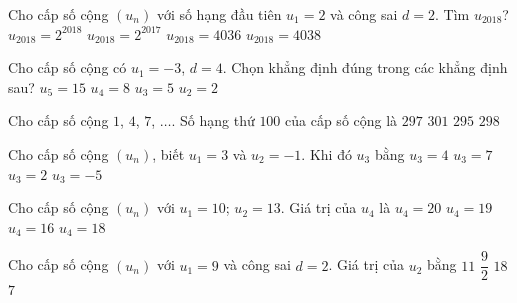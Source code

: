 \begin{ex}%
	Cho cấp số cộng $(u_n)$ với số hạng đầu tiên $u_1=2$ và công  sai $d=2$. Tìm $u_{2018}$?
	 \choice
		 {$u_{2018}=2^{2018}$}
		{$u_{2018}=2^{2017}$} 
		{\True $u_{2018}=4036$} 
		 {$u_{2018}=4038$}
\end{ex}

\begin{ex}%
	Cho cấp số cộng  có $u_1=-3$, $d=4$. Chọn khẳng định đúng trong các khẳng định sau?
	 \choice
		 {$u_5=15$}
		{$u_4=8$} 
		{\True $u_3=5$} 
		 {$u_2=2$}
\end{ex}

\begin{ex}%
	Cho cấp số cộng $1$, $4$, $7$, $\ldots$. Số  hạng thứ $100$ của cấp số cộng là
	\choice 
		 {$297$}
		{$301$} 
		{$295$} 
		 {\True $298$}
\end{ex}

\begin{ex}%
	Cho cấp số cộng $(u_n)$, biết $u_1=3$ và $u_2=-1$. Khi đó $u_3$ bằng 
	\choice 
		 {$u_3=4$}
		{$u_3=7$} 
		{$u_3=2$} 
		 {\True $u_3=-5$}
\end{ex}

\begin{ex}%
	Cho cấp số cộng $(u_n)$ với $u_1=10$;  $u_2=13$. Giá trị của $u_4$ là
	 \choice
		{$u_4=20$} 
		{\True  $u_4=19$}
		{$u_4=16$} 
		{$u_4=18$} 
\end{ex}

\begin{ex}%
	Cho cấp số cộng $(u_n)$ với $u_1=9$ và công sai $d=2$. Giá  trị của $u_2$ bằng
	\choice 
		{\True$11$} 
		{$\dfrac{9}{2}$} 
		 {$18$}
		 {$7$}
\end{ex}

